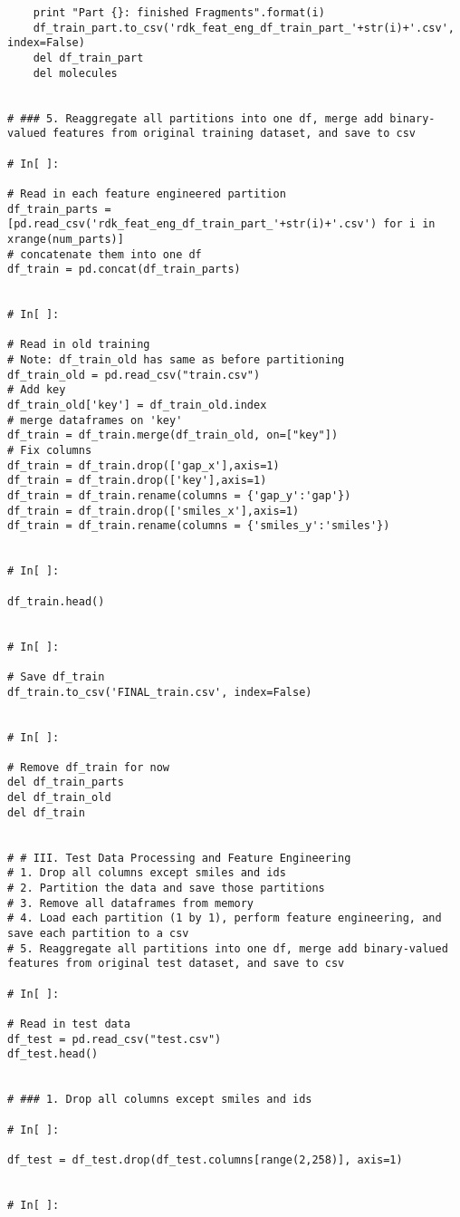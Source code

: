 \documentclass[11pt, oneside]{article}   	%
\begin{document}
\begin{lstlisting}
    print "Part {}: finished Fragments".format(i)
    df_train_part.to_csv('rdk_feat_eng_df_train_part_'+str(i)+'.csv', index=False)
    del df_train_part
    del molecules


# ### 5. Reaggregate all partitions into one df, merge add binary-valued features from original training dataset, and save to csv

# In[ ]:

# Read in each feature engineered partition
df_train_parts = [pd.read_csv('rdk_feat_eng_df_train_part_'+str(i)+'.csv') for i in xrange(num_parts)]
# concatenate them into one df
df_train = pd.concat(df_train_parts)


# In[ ]:

# Read in old training
# Note: df_train_old has same as before partitioning
df_train_old = pd.read_csv("train.csv")
# Add key
df_train_old['key'] = df_train_old.index
# merge dataframes on 'key'
df_train = df_train.merge(df_train_old, on=["key"])
# Fix columns
df_train = df_train.drop(['gap_x'],axis=1)
df_train = df_train.drop(['key'],axis=1)
df_train = df_train.rename(columns = {'gap_y':'gap'})
df_train = df_train.drop(['smiles_x'],axis=1)
df_train = df_train.rename(columns = {'smiles_y':'smiles'})


# In[ ]:

df_train.head()


# In[ ]:

# Save df_train
df_train.to_csv('FINAL_train.csv', index=False)


# In[ ]:

# Remove df_train for now
del df_train_parts
del df_train_old
del df_train


# # III. Test Data Processing and Feature Engineering
# 1. Drop all columns except smiles and ids
# 2. Partition the data and save those partitions
# 3. Remove all dataframes from memory
# 4. Load each partition (1 by 1), perform feature engineering, and save each partition to a csv
# 5. Reaggregate all partitions into one df, merge add binary-valued features from original test dataset, and save to csv

# In[ ]:

# Read in test data
df_test = pd.read_csv("test.csv")
df_test.head()


# ### 1. Drop all columns except smiles and ids

# In[ ]:

df_test = df_test.drop(df_test.columns[range(2,258)], axis=1)


# In[ ]:


\end{lstlisting}
\end{document}
